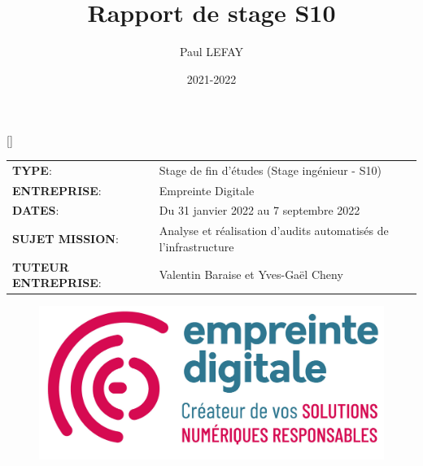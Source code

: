 \documentclass[12pt]{article}
\title{Rapport de stage S10}
\author{Paul LEFAY}
\date{2021-2022}
\begin{document}
\cfoot{\thepage}

\renewcommand{\headrulewidth}{0.4pt}
\renewcommand{\footrulewidth}{0.4pt}
\renewcommand{\contentsname}{Table des matières}
\renewcommand{\listfigurename}{}
\renewcommand{\listtablename}{}
\renewcommand{\thebibliography}{}
\renewcommand{\glossarysection}[2][]{}
\patchcmd{\thebibliography}{\section*{\refname}}{}{}{}
[\refname]{}

\makeatletter
\preto{\@verbatim}{\topsep=0pt \partopsep=0pt }
\makeatother
{}

\maketitle
\thispagestyle{empty}
\begin{center}
	\begin{tabular}{ m{5cm} m{11.5cm} }
	\textbf{TYPE}: & \mbox{\ooalign{$\checkmark$\cr\hidewidth$\square$\hidewidth\cr}}  Stage de fin d'études (Stage ingénieur - S10) \\
   \textbf{ENTREPRISE}:  & Empreinte Digitale \\
   \textbf{DATES}: & Du 31 janvier 2022 au 7 septembre 2022 \\
   \textbf{SUJET MISSION}: & Analyse et réalisation d'audits automatisés de l'infrastructure \\
   \textbf{TUTEUR ENTREPRISE}:  & Valentin Baraise et Yves-Gaël Cheny \\
 \end{tabular}
\end{center}

\begin{figure}[!ht]
    \centering
    \includegraphics[scale=0.8]{src/logo_ed.png}
    \label{fig:ed_logo}
\end{figure}
\end{document}
